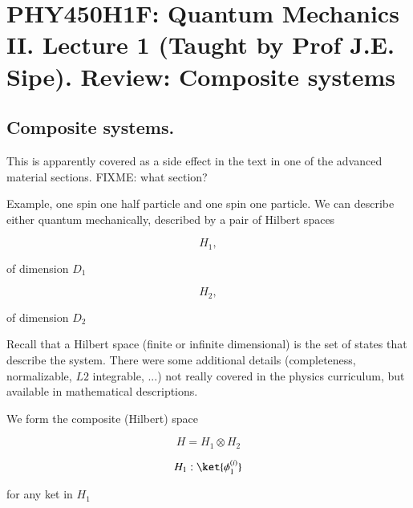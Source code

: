 %
%

\chapter{PHY450H1F: Quantum Mechanics II.  Lecture 1 (Taught by Prof J.E. Sipe).  Review: Composite systems}
\label{chap:qmTwoL1}
{}
\date{Sept 12, 2011}

\beginArtWithToc

\section{Composite systems.}

This is apparently covered as a side effect in the text \cite{desai2009quantum} in one of the advanced material sections.  FIXME: what section?

Example, one spin one half particle and one spin one particle.  We can describe either quantum mechanically, described by a pair of Hilbert spaces

\begin{equation}\label{eqn:qmTwoL1:10}
H_1,
\end{equation}

of dimension $D_1$

\begin{equation}\label{eqn:qmTwoL1:30}
H_2,
\end{equation}

of dimension $D_2$

Recall that a Hilbert space (finite or infinite dimensional) is the set of states that describe the system.  There were some additional details (completeness, normalizable, $L2$ integrable, ...) not really covered in the physics curriculum, but available in mathematical descriptions.

We form the composite (Hilbert) space

\begin{equation}\label{eqn:qmTwoL1:50}
H = H_1 \otimes H_2
\end{equation}

\begin{equation}\label{eqn:qmTwoL1:70}
H_1 : { \ket{\phi_1^{(i)}} }
\end{equation}

for any ket in $H_1$

